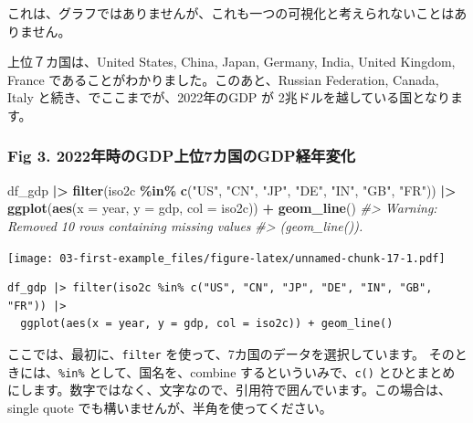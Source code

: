 \documentclass[
  xelatex, ja=standard]{bxjsbook}
\newenvironment{Shaded}{\begin{snugshade}}{\end{snugshade}}
\newcommand{\AttributeTok}[1]{\textcolor[rgb]{0.13,0.29,0.53}{#1}}
\newcommand{\CommentTok}[1]{\textcolor[rgb]{0.56,0.35,0.01}{\textit{#1}}}
\newcommand{\FunctionTok}[1]{\textcolor[rgb]{0.13,0.29,0.53}{\textbf{#1}}}
\newcommand{\NormalTok}[1]{#1}
\newcommand{\SpecialCharTok}[1]{\textcolor[rgb]{0.81,0.36,0.00}{\textbf{#1}}}
\newcommand{\StringTok}[1]{\textcolor[rgb]{0.31,0.60,0.02}{#1}}
\theoremstyle{definition}
\theoremstyle{definition}
\theoremstyle{definition}
\theoremstyle{definition}
\theoremstyle{remark}
\begin{document}
これは、グラフではありませんが、これも一つの可視化と考えられないことはありません。

上位７カ国は、United States, China, Japan, Germany, India, United Kingdom, France であることがわかりました。このあと、Russian Federation, Canada, Italy と続き、でここまでが、2022年のGDP が 2兆ドルを越している国となります。

\hypertarget{fig-3.-2022ux5e74ux6642ux306egdpux4e0aux4f4d7ux30abux56fdux306egdpux7d4cux5e74ux5909ux5316}{%
\subsubsection{Fig 3. 2022年時のGDP上位7カ国のGDP経年変化}\label{fig-3.-2022ux5e74ux6642ux306egdpux4e0aux4f4d7ux30abux56fdux306egdpux7d4cux5e74ux5909ux5316}}

\begin{Shaded}
\begin{Highlighting}[]
\NormalTok{df\_gdp }\SpecialCharTok{|\textgreater{}} \FunctionTok{filter}\NormalTok{(iso2c }\SpecialCharTok{\%in\%} \FunctionTok{c}\NormalTok{(}\StringTok{"US"}\NormalTok{, }\StringTok{"CN"}\NormalTok{, }\StringTok{"JP"}\NormalTok{, }\StringTok{"DE"}\NormalTok{, }\StringTok{"IN"}\NormalTok{, }\StringTok{"GB"}\NormalTok{, }\StringTok{"FR"}\NormalTok{)) }\SpecialCharTok{|\textgreater{}}
  \FunctionTok{ggplot}\NormalTok{(}\FunctionTok{aes}\NormalTok{(}\AttributeTok{x =}\NormalTok{ year, }\AttributeTok{y =}\NormalTok{ gdp, }\AttributeTok{col =}\NormalTok{ iso2c)) }\SpecialCharTok{+} \FunctionTok{geom\_line}\NormalTok{()}
\CommentTok{\#\textgreater{} Warning: Removed 10 rows containing missing values}
\CommentTok{\#\textgreater{} (\textasciigrave{}geom\_line()\textasciigrave{}).}
\end{Highlighting}
\end{Shaded}

\texttt{[image: 03-first-example\_files/figure-latex/unnamed-chunk-17-1.pdf]}

\begin{verbatim}
df_gdp |> filter(iso2c %in% c("US", "CN", "JP", "DE", "IN", "GB", "FR")) |>
  ggplot(aes(x = year, y = gdp, col = iso2c)) + geom_line()
\end{verbatim}

ここでは、最初に、\texttt{filter} を使って、7カ国のデータを選択しています。 そのときには、\texttt{\%in\%} として、国名を、combine するといういみで、\texttt{c()} とひとまとめにします。数字ではなく、文字なので、引用符で囲んでいます。この場合は、single quote でも構いませんが、半角を使ってください。
\end{document}
